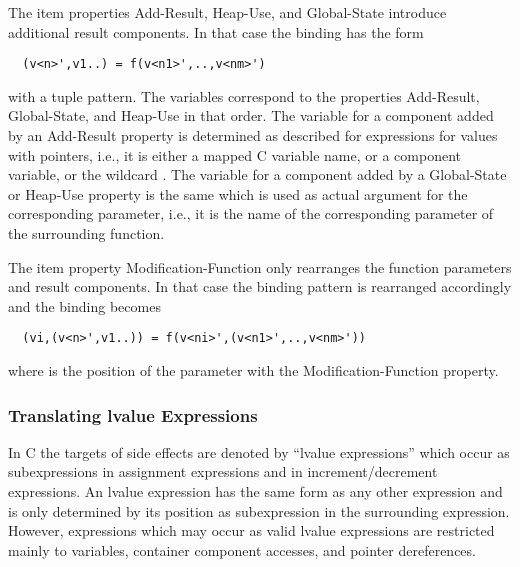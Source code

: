 The item properties Add-Result, Heap-Use, and Global-State introduce additional result components. In that case the binding has 
the form
\begin{verbatim}
  (v<n>',v1..) = f(v<n1>',..,v<nm>')
\end{verbatim}
with a tuple pattern. The variables  correspond to the properties Add-Result, Global-State, and Heap-Use in that order.
The variable for a component added by an Add-Result property is determined as described for expressions for values with pointers,
i.e., it is either a mapped C variable name, or a component variable, or the wildcard \code{\_}. The variable for a component
added by a Global-State or Heap-Use property is the same which is used as actual argument for the corresponding parameter, i.e.,
it is the name of the corresponding parameter of the surrounding function.

The item property Modification-Function only rearranges the function parameters and result components. In that case the binding
pattern is rearranged accordingly and the binding becomes
\begin{verbatim}
  (vi,(v<n>',v1..)) = f(v<ni>',(v<n1>',..,v<nm>'))
\end{verbatim}
where  is the position of the parameter with the Modification-Function property.

\subsubsection{Translating lvalue Expressions}

In C the targets of side effects are denoted by ``lvalue expressions'' which occur as subexpressions in assignment expressions and
in increment/decrement expressions. An lvalue expression has the same form as any other expression and is only determined by its 
position as subexpression in the surrounding expression. However, expressions which may occur as valid lvalue expressions are 
restricted mainly to variables, container component accesses, and pointer dereferences.

